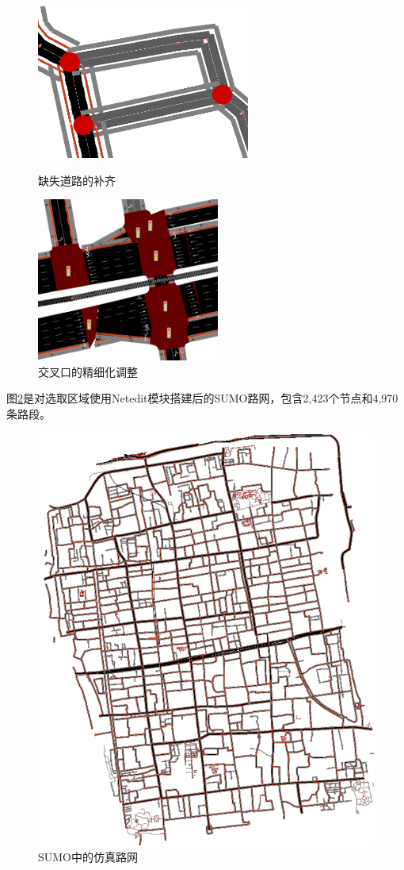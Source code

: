 \begin{figure}
  \centering
    \begin{minipage}[t]{0.48\textwidth}
      \centering
      \includegraphics[width=7cm]{figures/content/netedit1.png}
      \caption{缺失道路的补齐}
      \label{netedit1}
    \end{minipage}
    \begin{minipage}[t]{0.48\textwidth}
      \centering
      \includegraphics[width=6cm]{figures/content/netedit2.png}
      \caption{交叉口的精细化调整}
      \label{netedit2}
    \end{minipage}
\end{figure}



图\ref{suzhousumo}是对选取区域使用Netedit模块搭建后的SUMO路网，包含2,423个节点和4,970条路段。

\begin{figure}[H]
  \centering
  \includegraphics[width=.5\linewidth]{figures/content/suzhousumo.png}
  \caption{SUMO中的仿真路网}
  \label{suzhousumo}
\end{figure}

